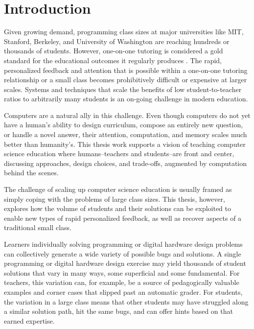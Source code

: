 \chapter{Introduction}\label{chapter:introduction}

Given growing demand, programming class sizes at major universities like MIT, Stanford, Berkeley, and University of Washington are reaching hundreds or thousands of students. However, one-on-one tutoring is considered a gold standard for the educational outcomes it regularly produces \cite{bloom}. The rapid, personalized feedback and attention that is possible within a one-on-one tutoring relationship or a small class becomes prohibitively difficult or expensive at larger scales. Systems and techniques that scale the benefits of low student-to-teacher ratios to arbitrarily many students is an on-going challenge in modern education.

Computers are a natural ally in this challenge. Even though computers do not yet have a human's ability to design curriculum, compose an entirely new question, or handle a novel answer, their attention, computation, and memory scales much better than humanity's. This thesis work supports a vision of teaching computer science education where humans--teachers and students--are front and center, discussing approaches, design choices, and trade-offs, augmented by computation behind the scenes.

The challenge of scaling up computer science education is usually framed as simply coping with the problems of large class sizes. This thesis, however, explores how the volume of students and their solutions can be exploited to enable new types of rapid personalized feedback, as well as recover aspects of a traditional small class.

Learners individually solving programming or digital hardware design problems can collectively generate a wide variety of possible bugs and solutions. A single programming or digital hardware design exercise may yield thousands of student solutions that vary in many ways, some superficial and some fundamental. For teachers, this variation can, for example, be a source of pedagogically valuable examples and corner cases that slipped past an automatic grader. For students, the variation in a large class means that other students may have struggled along a similar solution path, hit the same bugs, and can offer hints based on that earned expertise. 

